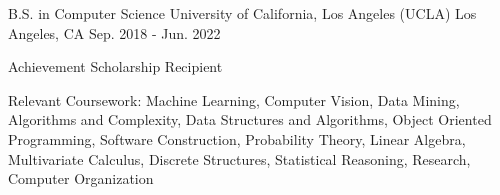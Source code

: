 

\begin{cventries}

  \cventry
    {B.S. in Computer Science} %
    {University of California, Los Angeles (UCLA)} %
    {Los Angeles, CA} %
    {Sep. 2018 - Jun. 2022} %
    {
      \begin{cvitems} %
        \item {Achievement Scholarship Recipient}
        \item {Relevant Coursework: Machine Learning, Computer Vision, Data Mining,
        Algorithms and Complexity, Data Structures and Algorithms, Object Oriented 
        Programming, Software Construction, Probability Theory, Linear Algebra, 
        Multivariate Calculus, Discrete Structures, Statistical Reasoning, 
        Research, Computer Organization}
      \end{cvitems}
    }

\end{cventries}
